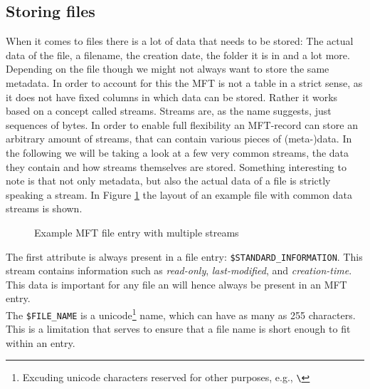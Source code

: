 \subsection{Storing files}
When it comes to files there is a lot of data that needs to be stored: The actual data of the file, a filename, the creation date, the folder it is in and a lot more. Depending on the file though we might not always want to store the same metadata. In order to account for this the MFT is not a table in a strict sense, as it does not have fixed columns in which data can be stored. Rather it works based on a concept called streams. Streams are, as the name suggests, just sequences of bytes. In order to enable full flexibility an MFT-record can store an arbitrary amount of streams, that can contain various pieces of (meta-)data. In the following we will be taking a look at a few very common streams, the data they contain and how streams themselves are stored. Something interesting to note is that not only metadata, but also the actual data of a file is strictly speaking a stream. In Figure \ref{fig:mft_entry} the layout of an example file with common data streams is shown. 
\begin{figure}[H]
	\centering
	\caption{Example MFT file entry with multiple streams\label{fig:mft_entry}}
\end{figure}
The first attribute is always present in a file entry: \texttt{\$STANDARD\_INFORMATION}. This stream contains information such as \textit{read-only}, \textit{last-modified}, and \textit{creation-time}. This data is important for any file an will hence always be present in an MFT entry.\cite{RUSSINOVICH_ET_AL:2012:WI}\\
The \texttt{\$FILE\_NAME} is a unicode\footnote{Excuding unicode characters reserved for other purposes, e.g., \texttt{\textbackslash}} name, which can have as many as 255 characters.\cite{microsoftinc:2018:MFP} This is a limitation that serves to ensure that a  file name is  short enough to fit within an entry.
